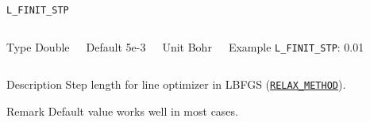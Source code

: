\documentclass[xcolor=dvipsnames,t]{beamer}
\begin{document}
\begin{frame}[allowframebreaks]{\texttt{L\_FINIT\_STP}} \label{L_FINIT_STP}
\vspace*{-12pt}
\begin{columns}
\begin{block}{Type}
Double
\end{block}

\begin{block}{Default}
5e-3
\end{block}

\begin{block}{Unit}
Bohr
\end{block}

\begin{block}{Example}
\texttt{L\_FINIT\_STP}: 0.01
\end{block}
\end{columns}

\begin{block}{Description}
Step length for line optimizer in LBFGS (\hyperlink{RELAX_METHOD}{\texttt{RELAX\_METHOD}}).
\end{block}

\begin{block}{Remark}
Default value works well in most cases.
\end{block}

\end{frame}
\end{document}
